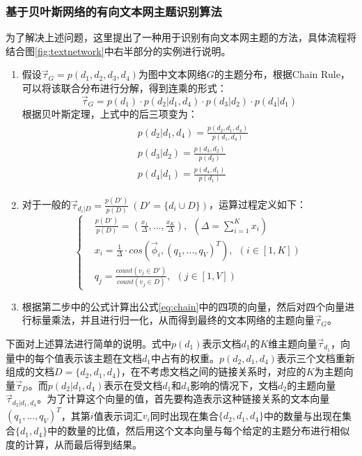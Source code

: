 \subsubsection{基于贝叶斯网络的有向文本网主题识别算法}
为了解决上述问题，这里提出了一种用于识别有向文本网主题的方法，具体流程将结合图\ref{fig:textnetwork}中右半部分的实例进行说明。
\begin{enumerate}
\item 假设$\vec{\tau}_G=p(d_1,d_2,d_3,d_4)$为图中文本网络$G$的主题分布，根据Chain Rule，可以将该联合分布进行分解，得到连乘的形式：
\begin{equation}
  \label{eq:chain}
  \vec{\tau}_G=p(d_1)\cdot p(d_2|d_1,d_4)\cdot p(d_3|d_2)\cdot p(d_4|d_1)
\end{equation}
根据贝叶斯定理，上式中的后三项变为：
\begin{eqnarray}
  \begin{aligned}
  & p(d_2|d_1,d_4)=\frac{p(d_2,d_1,d_4)}{p(d_1,d_4)} \\
  & p(d_3|d_2)=\frac{p(d_3,d_2)}{p(d_2)} \\
  & p(d_4|d_1)=\frac{p(d_4,d_1)}{p(d_1)}
  \end{aligned}
\end{eqnarray}
\item 对于一般的$\vec{\tau}_{d_i|D}=\frac{p(D')}{p(D)}~(D'=\{d_i\cup D\})$，运算过程定义如下：
\begin{equation}
  \left\{
  \begin{aligned}
  & \frac{p(D')}{p(D)}=(\frac{x_1}{\Delta},...,\frac{x_K}{\Delta}),~~(\Delta=\sum_{i=1}^{K}x_i) \\
  & x_i=\frac{1}{\Delta}\cdot cos(\vec{\phi}_i,(q_1,...,q_V)^T),~~(i\in [1,K]) \\
  & q_j=\frac{count(v_j\in D')}{count(v_j\in D)},~~(j\in [1,V])
  \end{aligned}
  \right.
\end{equation}
\item 根据第二步中的公式计算出公式\ref{eq:chain}中的四项的向量，然后对四个向量进行标量乘法，并且进行归一化，从而得到最终的文本网络的主题向量$\vec{\tau}_G$。
\end{enumerate}

下面对上述算法进行简单的说明。式中$p(d_1)$表示文档$d_1$的$K$维主题向量$\vec{\tau}_{d_1}$，向量中的每个值表示该主题在文档$d_1$中占有的权重。$p(d_2,d_1,d_4)$表示三个文档重新组成的文档$D=\{d_2,d_1,d_4\}$，在不考虑文档之间的链接关系时，对应的$K$为主题向量$\vec{\tau}_D$。而$p(d_2|d_1,d_4)$表示在受文档$d_1$和$d_4$影响的情况下，文档$d_2$的主题向量$\vec{\tau}_{d_2|d_1,d_4}$。为了计算这个向量的值，首先要构造表示这种链接关系的文本向量$(q_1,...,q_V)^T$，其第$i$值表示词汇$v_i$同时出现在集合$\{d_2,d_1,d_4\}$中的数量与出现在集合$\{d_1,d_4\}$中的数量的比值，然后用这个文本向量与每个给定的主题分布进行相似度的计算，从而最后得到结果。

